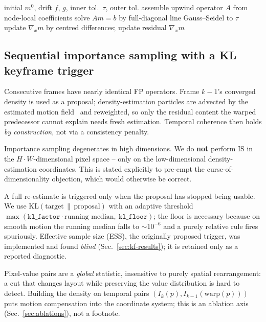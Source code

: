 \begin{algorithm}[t]
\caption{Per-frame FP solve (fixed-point over the linearised operator).}
\label{alg:solve}
\begin{algorithmic}
\Require initial $m^{0}$, drift $f$, $g$, inner tol.\ $\tau$, outer tol.
  \State assemble upwind operator $A$ from node-local coefficients
  \State solve $A m = b$ by full-diagonal line Gauss--Seidel to $\tau$
  \State update $\nabla_x m$ by centred differences; update residual
\EndWhile
\State \Return $\nabla_x m$
\end{algorithmic}
\end{algorithm}

\subsection{Sequential importance sampling with a KL keyframe trigger}
\label{sec:keyframe}
Consecutive frames have nearly identical FP operators. Frame $k{-}1$'s converged
density is used as a proposal; density-estimation particles are advected by the
estimated motion field~\cite{teed-2020-raft} and reweighted, so only the
residual content the warped predecessor cannot explain needs fresh estimation.
Temporal coherence then holds \emph{by construction}, not via a consistency
penalty.

\begin{remark}[Dimensionality]
Importance sampling degenerates in high dimensions. We do \textbf{not} perform IS
in the $H\!\cdot\!W$-dimensional pixel space -- only on the low-dimensional
density-estimation coordinates. This is stated explicitly to pre-empt the
curse-of-dimensionality objection, which would otherwise be correct.
\end{remark}

A full re-estimate is triggered only when the proposal has stopped being usable.
We use $\mathrm{KL}(\text{target}\,\|\,\text{proposal})$ with an adaptive
threshold $\max(\texttt{kl\_factor}\cdot\text{running median},\ \texttt{kl\_floor})$;
the floor is necessary because on smooth motion the running median falls to
$\sim\!10^{-6}$ and a purely relative rule fires spuriously. Effective sample
size (ESS), the originally proposed trigger, was implemented and found
\emph{blind} (Sec.~\ref{sec:kf-results}); it is retained only as a reported
diagnostic.

\begin{remark}
Pixel-value pairs are a \emph{global} statistic, insensitive to purely spatial
rearrangement: a cut that changes layout while preserving the value distribution
is hard to detect. Building the density on temporal pairs
$(I_k(p), I_{k-1}(\mathrm{warp}(p)))$ puts motion compensation into the
coordinate system; this is an ablation axis (Sec.~\ref{sec:ablations}), not a
footnote.
\end{remark}

